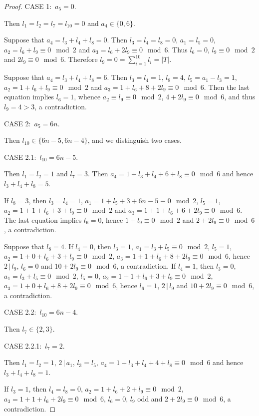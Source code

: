 \documentclass[a4paper, 10pt]{amsart}
\theoremstyle{plain}
\theoremstyle{definition}
\renewcommand{\t}{\, | \,}
\renewcommand{\t}{\, | \,}
\numberwithin{equation}{section}
\begin{document}
{\begin{proof}
\smallskip
\noindent CASE 1: \,$a_5 = 0$.

Then $l_1=l_2=l_7=l_{10} = 0$ and $a_4 \in \{0, 6\}$.

Suppose that $a_4 = l_3+l_4+l_8=0$. Then $l_3=l_4=l_8=0$,
$a_1=l_5=0$, $a_2 = l_6+l_9 \equiv 0 \mod 2$ and $a_3 = l_6 + 2l_9
\equiv 0 \mod 6$. Thus $l_6 = 0$, $l_9 \equiv 0 \mod 2$ and $2 l_9
\equiv 0 \mod 6$. Therefore $l_9 = 0 = \sum_{i=1}^{10} l_i = |T|$.

Suppose that $a_4 = l_3+l_4+l_8=6$. Then $l_3=l_4=1$, $l_8 = 4$,
$l_5 = a_1-l_3=1$, $a_2 = 1 + l_6 + l_9 \equiv 0 \mod 2$ and $a_3 =
1 + l_6 + 8 + 2l_9 \equiv 0 \mod 6$. Then the last equation implies
 $l_6 = 1$, whence $a_2 \equiv l_9 \equiv 0 \mod 2$,  $4 + 2 l_9
\equiv 0 \mod 6$, and thus $l_9=4>3$, a contradiction.

\smallskip
\noindent CASE 2: \,$a_5 = 6n$.

Then $l_{10} \in \{6n-5, 6n-4\}$, and we distinguish two cases.

\smallskip
\noindent CASE 2.1: \,$l_{10} = 6n-5$.

Then $l_1=l_2=1$ and $l_7 = 3$. Then $a_4=1+l_3+l_4+6+l_8 \equiv 0
\mod 6$ and hence $l_3+l_4+l_8=5$.

If $l_8=3$, then $l_3=l_4=1$, $a_1=1+l_5+3+6n-5 \equiv 0 \mod 2$,
$l_5=1$, $a_2=1+1+l_6+3+l_9 \equiv 0 \mod 2$ and $a_3=1+1+l_6+6+2l_9
\equiv 0 \mod 6$. The last equation implies $l_6=0$, hence $1+l_9
\equiv 0 \mod 2$ and $2+2l_9 \equiv 0 \mod 6$, a contradiction.

Suppose that $l_8=4$. If $l_4=0$, then $l_3=1$, $a_1=l_3+l_5 \equiv
0 \mod 2$, $l_5=1$, $a_2=1+0+l_6+3+l_9 \equiv 0 \mod 2$,
$a_3=1+1+l_6+8+2l_9 \equiv 0 \mod 6$, hence $2 \t l_9$, $l_6=0$ and
$10+2l_9 \equiv 0 \mod 6$, a contradiction. If $l_4=1$, then
$l_3=0$, $a_1=l_3+l_5 \equiv 0 \mod 2$, $l_5=0$, $a_2=1+1+l_6+3+l_9
\equiv 0 \mod 2$, $a_3=1+0+l_6+8+2l_9 \equiv 0 \mod 6$, hence
$l_6=1$, $2 \t l_9$ and $10+2l_9 \equiv 0 \mod 6$, a contradiction.

\smallskip
\noindent CASE 2.2: \,$l_{10} = 6n-4$.

Then $l_7 \in \{2,3\}$.

\smallskip
\noindent CASE 2.2.1: \,$l_{7} = 2$.

Then $l_1=l_2=1$, $2 \t a_1$, $l_3=l_5$, $a_4 = 1+l_3+l_4+4+l_8
\equiv 0 \mod 6$ and hence $l_3+l_4+l_8=1$.

If $l_3=1$, then $l_4=l_8=0$, $a_2=1+l_6+2+l_9 \equiv 0 \mod 2$,
$a_3=1+1+l_6+2l_9 \equiv 0 \mod 6$, $l_6=0$, $l_9$ odd and $2+2l_9
\equiv 0 \mod 6$, a contradiction.


\end{proof}}
\end{document}
